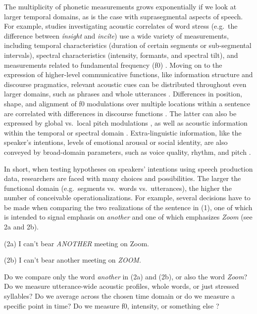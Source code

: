 \documentclass[Review,times,sageh]{sagej}
\begin{document}
The multiplicity of phonetic measurements grows exponentially if we look at larger temporal domains, as is the case with suprasegmental aspects of speech.
For example, studies investigating acoustic correlates of word stress (e.g.~the difference between \emph{ínsight} and \emph{incíte}) use a wide variety of measurements, including temporal characteristics (duration of certain segments or sub-segmental intervals), spectral characteristics (intensity, formants, and spectral tilt), and measurements related to fundamental frequency (f0) \citep[e.g.,][]{gordon2017acoustic}.
Moving on to the expression of higher-level communicative functions, like information structure and discourse pragmatics, relevant acoustic cues can be distributed throughout even larger domains, such as phrases and whole utterances \citep[e.g.,][]{ladd2008intonational}.
Differences in position, shape, and alignment of f0 modulations over multiple locations within a sentence are correlated with differences in discourse functions \citep[e.g.,][]{niebuhr2011}.
The latter can also be expressed by global vs.~local pitch modulations \citep{heuven2002}, as well as acoustic information within the temporal or spectral domain \citep[e.g.,][]{van2005speech}.
Extra-linguistic information, like the speaker's intentions, levels of emotional arousal or social identity, are also conveyed by broad-domain parameters, such as voice quality, rhythm, and pitch \citep{foulkes2006, ogden2004, white2009}.

In short, when testing hypotheses on speakers' intentions using speech production data, researchers are faced with many choices and possibilities.
The larger the functional domain (e.g.~segments vs.~words vs.~utterances), the higher the number of conceivable operationalizations.
For example, several decisions have to be made when comparing the two realizations of the sentence in (1), one of which is intended to signal emphasis on \emph{another} and one of which emphasizes \emph{Zoom} (see 2a and 2b).

\vspace{1em}

(2a) I can't bear \emph{ANOTHER} meeting on Zoom.

(2b) I can't bear another meeting on \emph{ZOOM}.

\vspace{1em}

\noindent Do we compare only the word \emph{another} in (2a) and (2b), or also the word \emph{Zoom}?
Do we measure utterance-wide acoustic profiles, whole words, or just stressed syllables?
Do we average across the chosen time domain or do we measure a specific point in time?
Do we measure f0, intensity, or something else \citep{stevens2000}?
\end{document}
